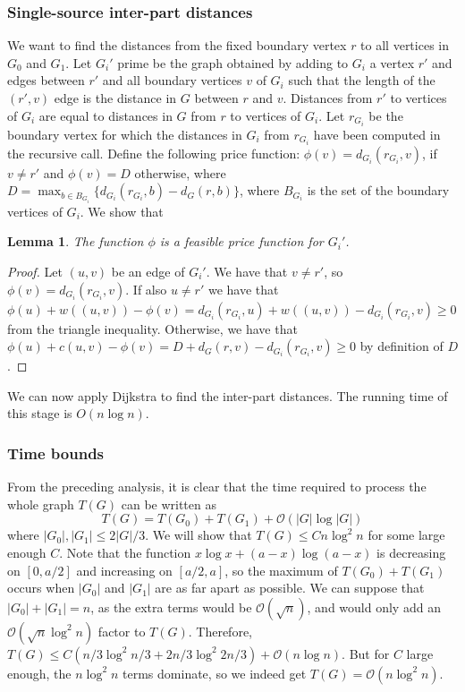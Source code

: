 \documentclass[11pt]{article}
\newtheorem{lemma}[theorem]{Lemma}
\begin{document}
\subsubsection{Single-source inter-part distances}

We want to find the distances from the fixed boundary vertex $r$ to all vertices in $G_0$ and $G_1$. Let $G_i'$ prime be the graph obtained by adding to $G_i$ a vertex $r'$ and edges between $r'$ and all boundary vertices $v$ of $G_i$ such that the length of the $(r',v)$ edge is the distance in $G$ between $r$ and $v$. Distances from $r'$ to vertices of $G_i$ are equal to distances in $G$ from $r$ to vertices of $G_i$. Let $r_{G_i}$ be the boundary vertex for which the distances in $G_i$ from $r_{G_i}$ have been computed in the recursive call. Define the following price function: $\phi(v) = d_{G_i}(r_{G_i},v)$, if $v\neq r'$ and $\phi(v) = D$ otherwise, where $D = \max_{b\in B_{G_i}}\{d_{G_i}(r_{G_i},b)-d_G(r,b)\}$, where $B_{G_i}$ is the set of the boundary vertices of $G_i$. We show that\\

\begin{lemma}
The function $\phi$ is a feasible price function for $G_i'$.
\end{lemma}

\begin{proof}
Let $(u,v)$ be an edge of $G_i'$. We have that $v\neq r'$, so $\phi(v) = d_{G_i}(r_{G_i},v)$. If also $u\neq r'$ we have that $\phi(u) + w((u,v)) -\phi(v) = d_{G_i}(r_{G_i},u) + w((u,v)) - d_{G_i}(r_{G_i},v)\geq 0$ from the triangle inequality. Otherwise, we have that $\phi(u)+c(u,v)-\phi(v) = D + d_G(r,v) - d_{G_i}(r_{G_i},v)\geq 0$ by definition of $D$.
\end{proof}

We can now apply Dijkstra to find the inter-part distances. The running time of this stage is $O(n \log n)$.

\subsubsection{Time bounds}

From the preceding analysis, it is clear that the time required to process the whole graph $T(G)$ can be written as 
\[
  T(G) = T(G_0) + T(G_1) + \mathcal{O}(|G| \log |G|)
\]
where $|G_0|, |G_1|\leq 2|G|/3$. We will show that $T(G) \leq Cn \log^2 n$ for some large enough $C$. Note that the function $x\log x + (a-x)\log (a-x)$ is decreasing on $[0,a/2]$ and increasing on $[a/2,a]$, so the maximum of $T(G_0)+T(G_1)$ occurs when $|G_0|$ and $|G_1|$ are as far apart as possible. We can suppose that $|G_0|+|G_1| = n$, as the extra terms would be $\mathcal{O}(\sqrt{n})$, and would only add an $\mathcal{O}(\sqrt{n}\log^2 n)$ factor to $T(G)$. Therefore, $T(G)\leq C(n/3\log^2 n/3 + 2n/3\log^2 2n/3) + \mathcal{O}(n\log n)$. But for $C$ large enough, the $n \log^2 n$ terms dominate, so we indeed get $T(G) = \mathcal{O}(n\log^2 n)$.
\end{document}
